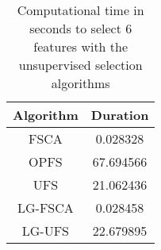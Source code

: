 \begin{table}
	\begin{center}
		\begin{tabular}{c c}
			Algorithm & Duration \\
			\hline
			FSCA & 0.028328 \\
			OPFS & 67.694566 \\
			UFS & 21.062436 \\
			LG-FSCA & 0.028458 \\
			LG-UFS & 22.679895 \\
		\end{tabular}
	\end{center}
	\caption{Computational time in seconds to select 6 features with the unsupervised selection algorithms}
\end{table}
